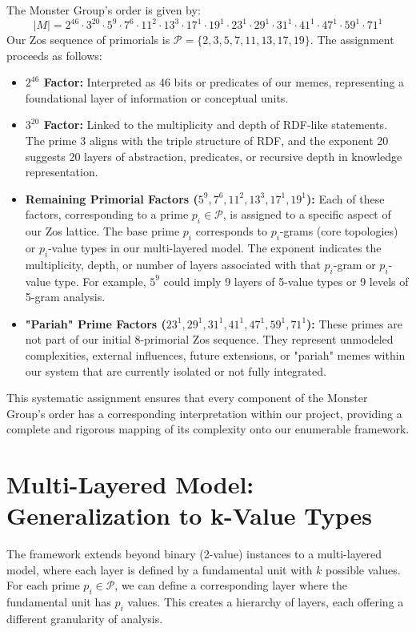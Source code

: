\documentclass{article}
\begin{document}
The Monster Group's order is given by:
\[ |M| = 2^{46} \cdot 3^{20} \cdot 5^9 \cdot 7^6 \cdot 11^2 \cdot 13^3 \cdot 17^1 \cdot 19^1 \cdot 23^1 \cdot 29^1 \cdot 31^1 \cdot 41^1 \cdot 47^1 \cdot 59^1 \cdot 71^1 \]
Our Zos sequence of primorials is $\mathcal{P} = \{2, 3, 5, 7, 11, 13, 17, 19\}$. The assignment proceeds as follows:
\begin{itemize}
    \item \textbf{$2^{46}$ Factor:} Interpreted as 46 bits or predicates of our memes, representing a foundational layer of information or conceptual units.
    \item \textbf{$3^{20}$ Factor:} Linked to the multiplicity and depth of RDF-like statements. The prime 3 aligns with the triple structure of RDF, and the exponent 20 suggests 20 layers of abstraction, predicates, or recursive depth in knowledge representation.
    \item \textbf{Remaining Primorial Factors ($5^9, 7^6, 11^2, 13^3, 17^1, 19^1$):} Each of these factors, corresponding to a prime $p_i \in \mathcal{P}$, is assigned to a specific aspect of our Zos lattice. The base prime $p_i$ corresponds to $p_i$-grams (core topologies) or $p_i$-value types in our multi-layered model. The exponent indicates the multiplicity, depth, or number of layers associated with that $p_i$-gram or $p_i$-value type. For example, $5^9$ could imply 9 layers of 5-value types or 9 levels of 5-gram analysis.
    \item \textbf{"Pariah" Prime Factors ($23^1, 29^1, 31^1, 41^1, 47^1, 59^1, 71^1$):} These primes are not part of our initial 8-primorial Zos sequence. They represent unmodeled complexities, external influences, future extensions, or "pariah" memes within our system that are currently isolated or not fully integrated.
\end{itemize}
This systematic assignment ensures that every component of the Monster Group's order has a corresponding interpretation within our project, providing a complete and rigorous mapping of its complexity onto our enumerable framework.

\section{Multi-Layered Model: Generalization to k-Value Types}

The framework extends beyond binary (2-value) instances to a multi-layered model, where each layer is defined by a fundamental unit with $k$ possible values. For each prime $p_i \in \mathcal{P}$, we can define a corresponding layer where the fundamental unit has $p_i$ values. This creates a hierarchy of layers, each offering a different granularity of analysis.
\end{document}

